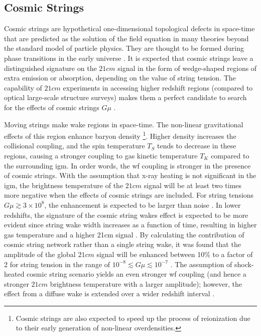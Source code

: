 \documentclass[12pt, TexShade, letterpaper]{report}
\begin{document}
\subsection{Cosmic Strings}
 Cosmic strings are hypothetical one-dimensional topological defects in space-time that are predicted as the solution of the field equation in many theories beyond the standard model of particle physics. They are thought to be formed during phase transitions in the early universe \cite{bryce_thesis, constrain_superconduct}.
 It is expected that cosmic strings leave a distinguished signature on the $21cm$ signal in the form of wedge-shaped regions of extra emission or absorption, depending on the value of string tension. The capability of $21cm$ experiments in accessing higher redshift regions (compared to optical large-scale structure surveys) makes them a perfect candidate to search for the effects of cosmic strings $G\mu$  \cite{cosmic_string_brandenberger, structure_cosmic_string}.\par
Moving strings make wake regions in space-time. The non-linear gravitational effects of this region enhance baryon density \footnote{Cosmic strings are also expected to speed up the process of reionization due to their early generation of non-linear overdensities\cite{corre_21cm_cmb}.}. Higher density increases the collisional coupling, and the spin temperature $T_S$ tends to decrease in these regions, causing a stronger coupling to gas kinetic temperature $T_K$ compared to the surrounding \gls{igm}. In order words, the \gls{wf} coupling is stronger in the presence of cosmic strings. With the assumption that x-ray heating is not significant in the \gls{igm}, the brightness temperature of the $21cm$ signal will be at least two times more negative when the effects of cosmic strings are included. For string tensions $G\mu \gtrsim 3\times 10^ 8$, the enhancement is expected to be larger than noise \cite{WF_effect_oscar}. In lower redshifts, the signature of the cosmic string wakes effect is expected to be more evident since string wake width increases as a function of time, resulting in higher gas temperature and a higher 21cm signal \cite{cosmic_string_brandenberger}.
By calculating the contribution of cosmic string network rather than a single string wake, it was found that the amplitude of the global $21cm$ signal will be enhanced between 10\% to a factor of 2 for string tension in the range of $10^{-8}\lesssim G\mu\lesssim10^{-7}$  \cite{cosmic_string_oscar}.
The assumption of shock-heated cosmic string scenario yields an even stronger \gls{wf} coupling (and hence a stronger $21cm$ brightness temperature with a larger amplitude); however, the effect from a diffuse wake is extended over a wider redshift interval \cite{oscar_robert_shock, WF_effect_oscar, cosmic_string_oscar}. \par
\end{document}
